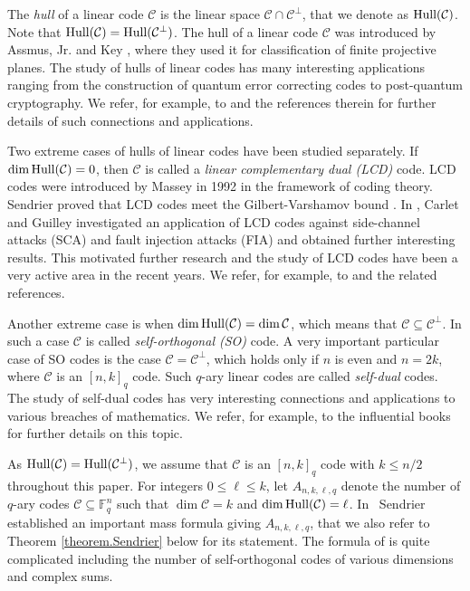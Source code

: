 \documentclass[a4paper,11pt]{article}
\newcommand{\F}{\mathbb{F}}
\newcommand{\hull}{\mbox{\rm Hull}}
\begin{document}
The {\it hull} of a linear code $\mathcal{C}$ is the linear space $\mathcal{C} \cap \mathcal{C}^\perp$, that we denote as $\hull(\mathcal{C})$. Note that $\hull(\mathcal{C})=\hull(\mathcal{C}^\perp)$. The hull of a linear code $\mathcal{C}$ was introduced by Assmus, Jr. and Key \cite{Assmus-Key}, where they used it for classification of finite projective planes. The study of hulls of linear codes has many interesting applications ranging from the construction of quantum error correcting codes to post-quantum cryptography. We refer, for example, to \cite{quantum+hull} and the references therein for further details of such connections and applications.

Two extreme cases of hulls of linear codes have been studied separately. If $\dim \hull(\mathcal{C})=0$, then $\mathcal{C}$ is called a {\it linear complementary dual (LCD)} code. LCD codes were introduced  by Massey \cite{Massey} in 1992 in the framework of coding theory. Sendrier proved that LCD codes meet the Gilbert-Varshamov bound \cite{Sendrier GV}. In \cite{Carlet_Guilley}, Carlet and Guilley investigated an  application of LCD codes against side-channel attacks (SCA) and fault injection attacks (FIA) and obtained further interesting results. This motivated further research and the study of LCD codes have been a very active area in the recent years. We refer, for example, to \cite{Carlet_Pellikaan,Dougherty-Kim-Sole-LCD,Kim-LCD,Harada-LCD} and the related references.

Another extreme case is when  $\dim \hull(\mathcal{C})= \dim \mathcal{C}$, which means that $\mathcal{C} \subseteq \mathcal{C}^\perp$. In such a case $\mathcal{C}$ is called {\it self-orthogonal (SO)} code.
A very important particular case of SO codes is the case $\mathcal{C}=\mathcal{C}^\perp$, which holds only if $n$ is even and $n=2k$, where $\mathcal{C}$ is an $[n,k]_q$ code. Such $q$-ary linear codes are called {\it self-dual} codes. The study of self-dual codes has very interesting connections and applications to various breaches of mathematics.  We refer, for example, to the influential books \cite{Conway_Sloane, Nebe} for further details on this topic.

As $\hull(\mathcal{C})=\hull(\mathcal{C}^\perp)$, we assume that $\mathcal{C}$ is an $[n,k]_q$ code with $k \le n/2$ throughout this paper. For integers $0 \le \ell \le k$, let $A_{n,k,\ell,q}$ denote the number of $q$-ary codes $\mathcal{C} \subseteq \F_q^n$ such that $\dim \mathcal{C}= k$ and $\dim \hull(\mathcal{C})=\ell$. In \cite{Sendrier_hull}\ Sendrier established an important mass formula giving $A_{n,k,\ell,q}$, that we also refer to Theorem \ref{theorem.Sendrier} below for its statement. The formula of \cite{Sendrier_hull} is quite complicated including the number of self-orthogonal codes of various dimensions and complex sums.
\end{document}
